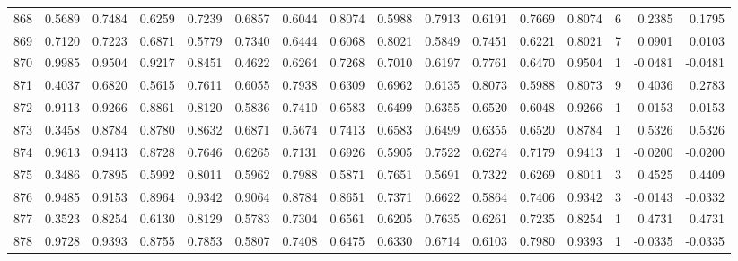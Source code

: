 \begin{tabular}{lrrrrrrrrrrrrrrr}
868 &      0.5689 &  0.7484 &  0.6259 &  0.7239 &  0.6857 &  0.6044 &  0.8074 &  0.5988 &  0.7913 &  0.6191 &   0.7669 &     0.8074 &      6 &                    0.2385 &                     0.1795 \\
869 &      0.7120 &  0.7223 &  0.6871 &  0.5779 &  0.7340 &  0.6444 &  0.6068 &  0.8021 &  0.5849 &  0.7451 &   0.6221 &     0.8021 &      7 &                    0.0901 &                     0.0103 \\
870 &      0.9985 &  0.9504 &  0.9217 &  0.8451 &  0.4622 &  0.6264 &  0.7268 &  0.7010 &  0.6197 &  0.7761 &   0.6470 &     0.9504 &      1 &                   -0.0481 &                    -0.0481 \\
871 &      0.4037 &  0.6820 &  0.5615 &  0.7611 &  0.6055 &  0.7938 &  0.6309 &  0.6962 &  0.6135 &  0.8073 &   0.5988 &     0.8073 &      9 &                    0.4036 &                     0.2783 \\
872 &      0.9113 &  0.9266 &  0.8861 &  0.8120 &  0.5836 &  0.7410 &  0.6583 &  0.6499 &  0.6355 &  0.6520 &   0.6048 &     0.9266 &      1 &                    0.0153 &                     0.0153 \\
873 &      0.3458 &  0.8784 &  0.8780 &  0.8632 &  0.6871 &  0.5674 &  0.7413 &  0.6583 &  0.6499 &  0.6355 &   0.6520 &     0.8784 &      1 &                    0.5326 &                     0.5326 \\
874 &      0.9613 &  0.9413 &  0.8728 &  0.7646 &  0.6265 &  0.7131 &  0.6926 &  0.5905 &  0.7522 &  0.6274 &   0.7179 &     0.9413 &      1 &                   -0.0200 &                    -0.0200 \\
875 &      0.3486 &  0.7895 &  0.5992 &  0.8011 &  0.5962 &  0.7988 &  0.5871 &  0.7651 &  0.5691 &  0.7322 &   0.6269 &     0.8011 &      3 &                    0.4525 &                     0.4409 \\
876 &      0.9485 &  0.9153 &  0.8964 &  0.9342 &  0.9064 &  0.8784 &  0.8651 &  0.7371 &  0.6622 &  0.5864 &   0.7406 &     0.9342 &      3 &                   -0.0143 &                    -0.0332 \\
877 &      0.3523 &  0.8254 &  0.6130 &  0.8129 &  0.5783 &  0.7304 &  0.6561 &  0.6205 &  0.7635 &  0.6261 &   0.7235 &     0.8254 &      1 &                    0.4731 &                     0.4731 \\
878 &      0.9728 &  0.9393 &  0.8755 &  0.7853 &  0.5807 &  0.7408 &  0.6475 &  0.6330 &  0.6714 &  0.6103 &   0.7980 &     0.9393 &      1 &                   -0.0335 &                    -0.0335 \\

\end{tabular}
